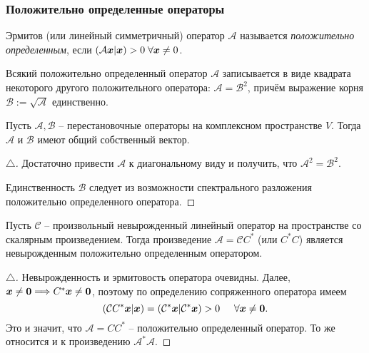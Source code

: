 \subsubsection{Положительно определенные операторы}
\begin{to_def} 
    Эрмитов (или линейный симметричный) оператор $\mathcal A$ называется \textit{положительно определенным}, если $(\mathcal A \mbox{\boldmath $x$} | \mbox{\boldmath $x$}) > 0 \; \forall \mbox{\boldmath $x$} \neq 0$.
\end{to_def}

\begin{to_lem} 
    Всякий положительно определенный оператор $\mathcal A$ записывается в виде квадрата некоторого другого положительного оператора: $\mathcal A = \mathcal B^2$, причём выражение корня $\mathcal B := \sqrt{\mathcal A}$ единственно.
\end{to_lem}

\begin{to_lem} 
    Пусть $\mathcal A, \mathcal B$ -- перестановочные операторы на комплексном пространстве $V$. Тогда $\mathcal A$ и $\mathcal B$ имеют общий собственный вектор. 
\end{to_lem}

\begin{proof}[$\triangle$]
    Достаточно привести $\mathcal A$ к диагональному виду и получить, что $\mathcal A^2 = \mathcal B^2$. 

    Единственность $\mathcal B$ следует из возможности спектрального разложения положительно определенного оператора. 
\end{proof}

\begin{to_lem} 
    Пусть $\mathcal C$ -- произвольный невырожденный линейный оператор на пространстве со скалярным произведением. Тогда произведение $\mathcal A = \mathcal C C^*$ (или $C^* C$) является невырожденным положительно определенным оператором. 
\end{to_lem}

\begin{proof}[$\triangle$]
    Невырожденность и эрмитовость оператора очевидны. Далее, $\mbox{\boldmath $x$} \neq \mbox{\boldmath $0$} \Longrightarrow C^* \mbox{\boldmath $x$} \neq \mbox{\boldmath $0$}$, поэтому по определению сопряженного оператора имеем
    $$
        (\mathcal C C^* \mbox{\boldmath $x$} | \mbox{\boldmath $x$}) = (\mathcal C^* \mbox{\boldmath $x$} | \mathcal C^* \mbox{\boldmath $x$}) > 0 \hspace{0.5cm} \forall \mbox{\boldmath $x$} \neq \mbox{\boldmath $0$}.
    $$
    Это и значит, что $\mathcal A = C C^*$ -- положительно определенный оператор. То же относится и к произведению $\mathcal A^* \mathcal A$. 
\end{proof}

